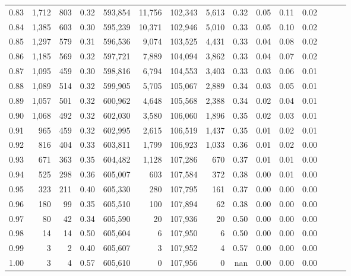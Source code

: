 \begin{tabular}{rrrrrrrrrrrrrrr}
0.83 &   1,712 &    803 &  0.32 &  593,854 &   11,756 &  102,343 &    5,613 &  0.32 &  0.05 &  0.11 &      0.02 \\
0.84 &   1,385 &    603 &  0.30 &  595,239 &   10,371 &  102,946 &    5,010 &  0.33 &  0.05 &  0.10 &      0.02 \\
0.85 &   1,297 &    579 &  0.31 &  596,536 &    9,074 &  103,525 &    4,431 &  0.33 &  0.04 &  0.08 &      0.02 \\
0.86 &   1,185 &    569 &  0.32 &  597,721 &    7,889 &  104,094 &    3,862 &  0.33 &  0.04 &  0.07 &      0.02 \\
0.87 &   1,095 &    459 &  0.30 &  598,816 &    6,794 &  104,553 &    3,403 &  0.33 &  0.03 &  0.06 &      0.01 \\
0.88 &   1,089 &    514 &  0.32 &  599,905 &    5,705 &  105,067 &    2,889 &  0.34 &  0.03 &  0.05 &      0.01 \\
0.89 &   1,057 &    501 &  0.32 &  600,962 &    4,648 &  105,568 &    2,388 &  0.34 &  0.02 &  0.04 &      0.01 \\
0.90 &   1,068 &    492 &  0.32 &  602,030 &    3,580 &  106,060 &    1,896 &  0.35 &  0.02 &  0.03 &      0.01 \\
0.91 &     965 &    459 &  0.32 &  602,995 &    2,615 &  106,519 &    1,437 &  0.35 &  0.01 &  0.02 &      0.01 \\
0.92 &     816 &    404 &  0.33 &  603,811 &    1,799 &  106,923 &    1,033 &  0.36 &  0.01 &  0.02 &      0.00 \\
0.93 &     671 &    363 &  0.35 &  604,482 &    1,128 &  107,286 &      670 &  0.37 &  0.01 &  0.01 &      0.00 \\
0.94 &     525 &    298 &  0.36 &  605,007 &      603 &  107,584 &      372 &  0.38 &  0.00 &  0.01 &      0.00 \\
0.95 &     323 &    211 &  0.40 &  605,330 &      280 &  107,795 &      161 &  0.37 &  0.00 &  0.00 &      0.00 \\
0.96 &     180 &     99 &  0.35 &  605,510 &      100 &  107,894 &       62 &  0.38 &  0.00 &  0.00 &      0.00 \\
0.97 &      80 &     42 &  0.34 &  605,590 &       20 &  107,936 &       20 &  0.50 &  0.00 &  0.00 &      0.00 \\
0.98 &      14 &     14 &  0.50 &  605,604 &        6 &  107,950 &        6 &  0.50 &  0.00 &  0.00 &      0.00 \\
0.99 &       3 &      2 &  0.40 &  605,607 &        3 &  107,952 &        4 &  0.57 &  0.00 &  0.00 &      0.00 \\
1.00 &       3 &      4 &  0.57 &  605,610 &        0 &  107,956 &        0 &   nan &  0.00 &  0.00 &      0.00 \\
\bottomrule
\end{tabular}
